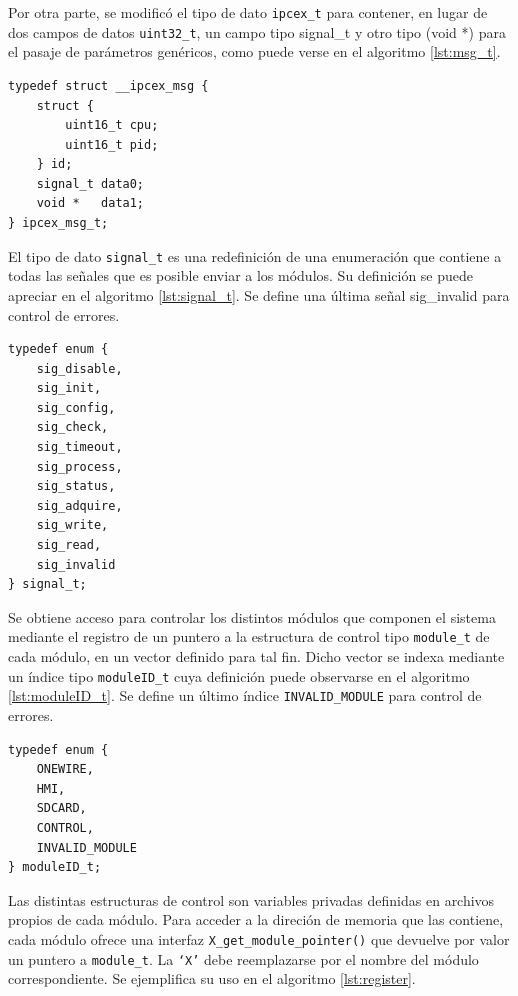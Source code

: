 Por otra parte, se modificó el tipo de dato \texttt{ipcex\_t} para contener, en lugar de dos campos de datos \texttt{uint32\_t}, un campo tipo signal\_t y otro tipo (void *) para el pasaje de parámetros genéricos, como puede verse en el algoritmo \ref{lst:msg_t}. 

\vspace{10px}
\begin{lstlisting}[caption={Definición nuevo tipo de dato ipcex\_msg\_t para intercambio de mensajes.},label={lst:msg_t}]
	typedef struct __ipcex_msg {
	struct {
		uint16_t cpu;
		uint16_t pid;
	} id;
	signal_t data0;
	void *   data1;
} ipcex_msg_t;
\end{lstlisting} 

El tipo de dato \texttt{signal\_t} es una redefinición de una enumeración que contiene a todas las señales que es posible enviar a los módulos.  Su definición se puede apreciar en el algoritmo \ref{lst:signal_t}. Se define una última señal sig\_invalid para control de errores.

\begin{lstlisting}[caption={Definición nuevo tipo de dato signal\_t para el envío de señales a los módulos.},label={lst:signal_t}]
typedef enum {
	sig_disable, 
	sig_init, 
	sig_config, 
	sig_check, 
	sig_timeout, 
	sig_process, 
	sig_status, 
	sig_adquire,  
	sig_write, 
	sig_read,
	sig_invalid
} signal_t;
\end{lstlisting}

Se obtiene acceso para controlar los distintos módulos que componen el sistema mediante el registro de un puntero a la estructura de control tipo \texttt{module\_t} de cada módulo, en un vector definido para tal fin.  Dicho vector se indexa mediante un índice tipo \texttt{moduleID\_t} cuya definición puede observarse en el algoritmo \ref{lst:moduleID_t}.  Se define un último índice \texttt{INVALID\_MODULE} para control de errores.

\begin{lstlisting}[caption={Definición nuevo tipo de dato moduleID\_t para indexar el control de los módulos.},label={lst:moduleID_t}]
typedef enum {
	ONEWIRE, 
	HMI, 
	SDCARD, 
	CONTROL, 
	INVALID_MODULE
} moduleID_t;
\end{lstlisting}

Las distintas estructuras de control son variables privadas definidas en archivos propios de cada módulo.  Para acceder a la direción de memoria que las contiene, cada módulo ofrece una interfaz \texttt{X\_get\_module\_pointer()} que devuelve por valor un puntero a \texttt{module\_t}. La \texttt{`X'} debe reemplazarse por el nombre del módulo correspondiente.  Se ejemplifica su uso en el algoritmo \ref{lst:register}.

